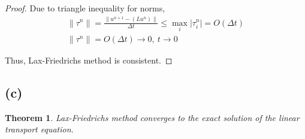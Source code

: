 \documentclass[a4paper]{amsproc}
\theoremstyle{plain}
\newtheorem*{thm}{Theorem}
\theoremstyle{definition}
\theoremstyle{remark}
\numberwithin{equation}{section}
\renewcommand{\le}{\leqslant}\renewcommand{\leq}{\leqslant}
\providecommand{\norm}[1]{\lVert#1 \rVert}
\begin{document}
\begin{proof}
% 
% 
% 
%  
%   
%   
    
  Due to triangle inequality for norms, \begin{multline} \norm{\tau^n} = \frac{\norm{u^{n+1} - (Lu^n)}}{\Delta t} \le \max_i \lvert \tau^n_i \rvert = O(\Delta t) \\   
   \norm{\tau^n}  = O(\Delta t) \longrightarrow 0, ~t \longrightarrow 0 \end{multline}
 
 Thus, Lax-Friedrichs method is consistent.
 
\end{proof}

\subsection*{(c)}

\begin{thm} 
Lax-Friedrichs method converges to the exact solution of the linear transport equation.
\end{thm}
\end{document}
